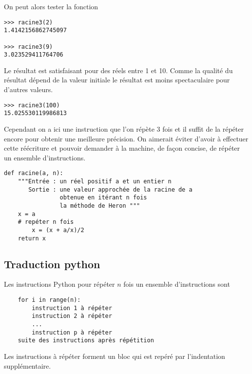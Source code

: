 On peut alors tester la fonction
\begin{lstlisting}
>>> racine3(2)
1.4142156862745097

>>> racine3(9)
3.023529411764706
\end{lstlisting}
Le résultat est satisfaisant pour des réels entre 1 et 10. Comme la qualité du résultat dépend de la valeur initiale le résultat est moins spectaculaire pour d'autres valeurs.
\begin{lstlisting}
>>> racine3(100)
15.025530119986813
\end{lstlisting}
Cependant on a ici une instruction que l'on répète 3 fois et il suffit de la répéter encore pour obtenir une meilleure précision. On aimerait éviter d'avoir à effectuer cette réécriture et pouvoir demander à la machine, de façon concise, de répéter un ensemble d'instructions.
\begin{lstlisting}
def racine(a, n):
    """Entrée : un réel positif a et un entier n
       Sortie : une valeur approchée de la racine de a
                obtenue en itérant n fois 
                la méthode de Heron """
    x = a
    # repéter n fois
        x = (x + a/x)/2
    return x
\end{lstlisting}
\subsection{Traduction python}
Les instructions Python pour répéter $n$ fois un ensemble d'instructions sont 
\begin{lstlisting}
    for i in range(n):
        instruction 1 à répéter
        instruction 2 à répéter
        ...
        instruction p à répéter
    suite des instructions après répétition
\end{lstlisting}
Les instructions à répéter forment un bloc qui est repéré par l'indentation supplémentaire.

